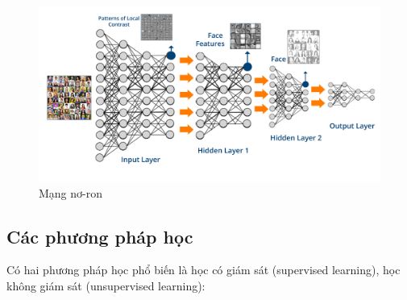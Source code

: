 \begin{center}
\begin{figure}[H]
\begin{center}
\includegraphics[scale=0.2]{chap3/image/nn_feature_extration.png}
\caption{Mạng nơ-ron}
\label{fig:supervisedlearning}
\end{center}
\end{figure}
\end{center}
\subsection{Các phương pháp học}
Có hai phương pháp học phổ biến là học có giám sát (supervised learning), học không giám sát (unsupervised learning):

